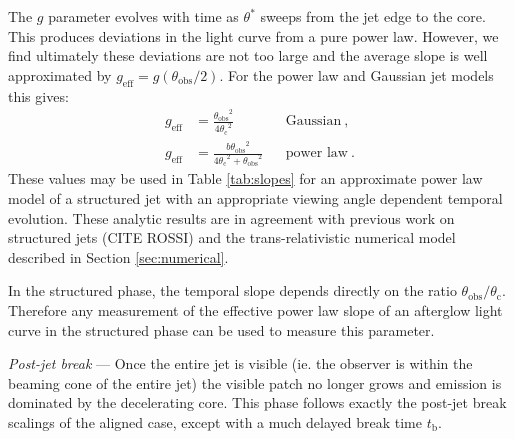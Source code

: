 \documentclass[twocolumn]{aastex62}
\newcommand{\tb}{\ensuremath{t_{\mathrm{b}}}}
\newcommand{\thobs}{\ensuremath{\theta_{\mathrm{obs}}}}
\newcommand{\thC}{\ensuremath{\theta_{\mathrm{c}}}}
\newcommand{\geff}{\ensuremath{g_{\mathrm{eff}}}}
\begin{document}
The $g$ parameter evolves with time as $\theta^*$ sweeps from the jet edge to the core.  This produces deviations in the light curve from a pure power law.  However, we find ultimately these deviations are not too large and the average slope is well approximated by $\geff  = g(\thobs/2)$.  For the power law and Gaussian jet models this gives:
\begin{align}
	\geff &= \frac{\thobs^2}{4\thC^2} && \text{Gaussian}\ , \\
	\geff &= \frac{b \thobs^2}{4 \thC^2+\thobs^2} && \text{power law}\ . \label{eq:geff}
\end{align}
These values may be used in Table \ref{tab:slopes} for an approximate power law model of a structured jet with an appropriate viewing angle dependent temporal evolution.  These analytic results are in agreement with previous work on structured jets (CITE ROSSI) and the trans-relativistic numerical model described in Section \ref{sec:numerical}.

In the structured phase, the temporal slope depends directly on the ratio $\thobs/\thC$.  Therefore any measurement of the effective power law slope of an afterglow light curve in the structured phase can be used to measure this parameter.

\emph{Post-jet break} --- Once the entire jet is visible (ie. the observer is within the beaming cone of the entire jet) the visible patch no longer grows and emission is dominated by the decelerating core.  This phase follows exactly the post-jet break scalings of the aligned case, except with a much delayed break time $\tb$.
\end{document}
